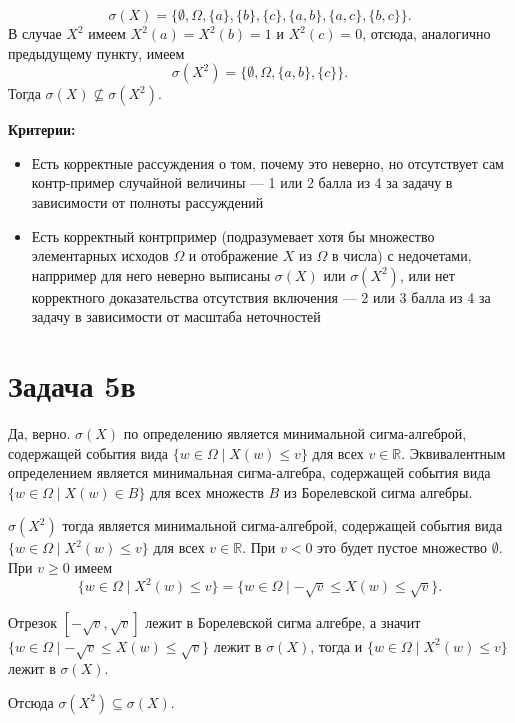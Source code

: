 \documentclass[12pt]{article}
\newcommand{\RR}{\mathbb{R}}
\begin{document}
\begin{enumerate}
\[
\sigma(X) = \{ \emptyset, \Omega, \{a\}, \{b\}, \{c\}, \{a, b\}, \{a, c\}, \{b, c\}\}.
\]
В случае $X^2$ имеем $X^2(a) = X^2(b) = 1$ и $X^2(c) = 0$, отсюда, аналогично предыдущему пункту, имеем
\[
\sigma(X^2) = \{ \emptyset, \Omega, \{a, b\}, \{c\}\}.
\]
Тогда $\sigma(X) \nsubseteq \sigma(X^2)$.

\vspace{0.3cm}

\newpage
\textbf{Критерии:}

\begin{itemize}
    \item Есть корректные рассуждения о том, почему это неверно, но отсутствует сам контр-пример случайной величины — 1 или 2 балла из 4 за задачу в зависимости от полноты рассуждений
    \item Есть корректный контрпример (подразумевает хотя бы множество элементарных исходов $\Omega$ и отображение $X$ из $\Omega$ в числа) с недочетами, напрример для него неверно выписаны $\sigma(X)$ или $\sigma(X^2)$, или нет корректного доказательства отсутствия включения — 2 или 3 балла из 4 за задачу в зависимости от масштаба неточностей
\end{itemize}


\section*{Задача 5в}

Да, верно. $\sigma(X)$ по определению является минимальной сигма-алгеброй, содержащей события вида $\{ w \in \Omega \mid X(w) \le v\}$ для всех $v \in \RR$. Эквивалентным определением является минимальная сигма-алгебра, содержащей события вида $\{ w \in \Omega \mid X(w) \in B\}$ для всех множеств $B$ из Борелевской сигма алгебры.

$\sigma(X^2)$ тогда является минимальной сигма-алгеброй, содержащей события вида $\{ w \in \Omega \mid X^2(w) \le v\}$ для всех $v \in \RR$. При $v < 0$ это будет пустое множество $\emptyset$. При $v \ge 0$ имеем $$\{ w \in \Omega \mid X^2(w) \le v\} = \{ w \in \Omega \mid -\sqrt{v} \le X(w) \le \sqrt{v}\}.$$

Отрезок $[-\sqrt{v}, \sqrt{v}]$ лежит в Борелевской сигма алгебре, а значит $\{w \in \Omega \mid -\sqrt{v} \le X(w) \le \sqrt{v}\}$ лежит в $\sigma(X)$, тогда и $\{ w \in \Omega \mid X^2(w) \le v\}$ лежит в $\sigma(X)$.

Отсюда $\sigma(X^2) \subseteq \sigma(X)$.

\vspace{0.3cm}



\end{enumerate}
\end{document}
